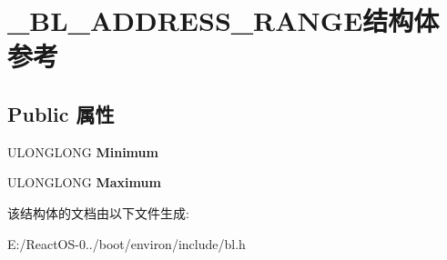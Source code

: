 \hypertarget{struct___b_l___a_d_d_r_e_s_s___r_a_n_g_e}{}\section{\+\_\+\+B\+L\+\_\+\+A\+D\+D\+R\+E\+S\+S\+\_\+\+R\+A\+N\+G\+E结构体 参考}
\label{struct___b_l___a_d_d_r_e_s_s___r_a_n_g_e}
\subsection*{Public 属性}
\begin{DoxyCompactItemize}
\item 
\mbox{\label{struct___b_l___a_d_d_r_e_s_s___r_a_n_g_e_ab362867039ee0e1fba8d1445dcbfea8d}} 
U\+L\+O\+N\+G\+L\+O\+NG {\bfseries Minimum}
\item 
\mbox{\label{struct___b_l___a_d_d_r_e_s_s___r_a_n_g_e_a392453bbc2e511451de6dcb42ab92de1}} 
U\+L\+O\+N\+G\+L\+O\+NG {\bfseries Maximum}
\end{DoxyCompactItemize}


该结构体的文档由以下文件生成\+:\begin{DoxyCompactItemize}
\item 
E\+:/\+React\+O\+S-\/0../boot/environ/include/bl.\+h\end{DoxyCompactItemize}
